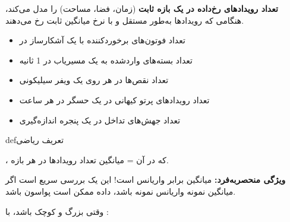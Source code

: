 

\textbf{تعداد رویدادهای رخ‌داده در یک بازه ثابت} (زمان، فضا، مساحت) را مدل می‌کند، هنگامی که رویدادها به‌طور مستقل و با نرخ میانگین ثابت رخ می‌دهند.


\begin{itemize}
\tightlist
\item
  تعداد فوتون‌های برخوردکننده با یک آشکارساز در 
\item
  تعداد بسته‌های واردشده به یک مسیریاب در 1 ثانیه
\item
  تعداد نقص‌ها در هر  روی یک ویفر سیلیکونی
\item
  تعداد رویدادهای پرتو کیهانی در یک حسگر در هر ساعت
\item
  تعداد جهش‌های تداخل در یک پنجره اندازه‌گیری
\end{itemize}

\begin{PSbox}[unbreakable]{def}{تعریف ریاضی}

، که در آن \lr{$\lambda$} = میانگین تعداد رویدادها در هر بازه.

\end{PSbox}









\textbf{ویژگی منحصربه‌فرد:} میانگین برابر واریانس است! این یک بررسی سریع است  اگر میانگین نمونه \lr{\mbox{\ensuremath{\approx}}} واریانس نمونه باشد، داده ممکن است پواسون باشد.


وقتی  بزرگ و  کوچک باشد، با :


